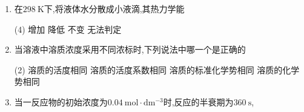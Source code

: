 \begin{enumerate}[label=\arabic*., itemsep=1.5ex]
    则$25^\circ\mathrm{C}$时,电极反应$\displaystyle \frac{1}{2}\ce{O2 + 2H^+ + 2e^- -> H2O}$的标准电极电势$\varphi_2^\ominus$为(设$K_\mathrm{w}=1\times10^{-14}$)
    \begin{tasks}(4)
        \task $-0.427\ \mathrm{V}$
        \task $0.401\ \mathrm{V}$
        \task $0.828\ \mathrm{V}$
        \task $1.229\ \mathrm{V}$
    \end{tasks}
    \item 在$298\ \mathrm{K}$下,将液体水分散成小液滴,其热力学能
    \begin{tasks}(4)
        \task 增加
        \task 降低
        \task 不变
        \task 无法判定
    \end{tasks}
    \item 当溶液中溶质浓度采用不同浓标时,下列说法中哪一个是正确的
    \begin{tasks}(2)
        \task 溶质的活度相同
        \task 溶质的活度系数相同
        \task 溶质的标准化学势相同
        \task 溶质的化学势相同
    \end{tasks}
    \item 当一反应物的初始浓度为$0.04\ \mathrm{mol\cdot dm^{-3}}$时,反应的半衰期为$360\ \mathrm{s}$,
    

\end{enumerate}
